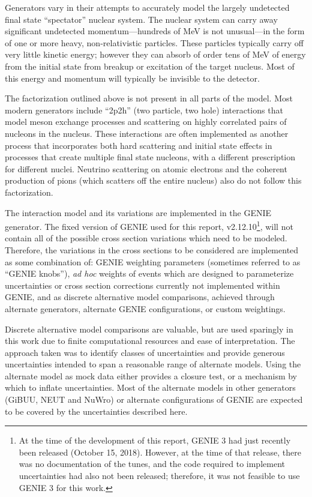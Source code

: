 Generators vary in their attempts to accurately model the largely undetected final state ``spectator'' nuclear system.  The nuclear system can carry away significant undetected momentum---hundreds of MeV is not unusual---in the form of one or more heavy, non-relativistic particles.  These particles typically carry off very little kinetic energy; however they can absorb of order tens of MeV of energy from the initial state from breakup or excitation of the target nucleus.  Most of this energy and momentum will typically be invisible to the detector.

The factorization outlined above is not present in all parts of the model.  Most modern generators include ``2p2h'' (two particle, two hole) interactions that model meson exchange processes and scattering on highly correlated pairs of nucleons in the nucleus.  These interactions are often implemented as another process that incorporates both hard scattering and initial state effects in processes that create multiple final state nucleons, with a different prescription for different nuclei.
Neutrino scattering on atomic electrons and the coherent production of pions (which scatters off the entire nucleus) also
do not follow this factorization.

The interaction model and its variations are implemented in the  GENIE generator.  The fixed version of GENIE used for this report, v2.12.10\footnote{At the time of the development of this report, GENIE 3 had just recently been released (October 15, 2018).  However, at the time of that release, there was no documentation of the tunes, and the code required to implement uncertainties had also not been released; therefore, it was not feasible to use GENIE 3 for this work.}, will not contain all of the possible cross section variations which need to be modeled.  Therefore, the variations in the cross sections to be considered are implemented as some combination of: GENIE weighting parameters (sometimes referred to as ``GENIE knobs''), {\it ad hoc} weights of events which are designed to parameterize uncertainties or cross section corrections currently not implemented within GENIE, and as discrete alternative model comparisons, achieved through alternate generators, alternate GENIE configurations, or custom weightings.

Discrete alternative model comparisons are valuable, but are used sparingly in this work due to finite computational resources and ease of interpretation. The approach taken was to identify classes of uncertainties and provide generous uncertainties intended to span a reasonable range of alternate models. Using the alternate model as mock data either provides a closure test, or a mechanism by which to inflate uncertainties. Most of the alternate models in other generators (GiBUU, NEUT and NuWro) or alternate configurations of GENIE are expected to be covered by the uncertainties described here.

